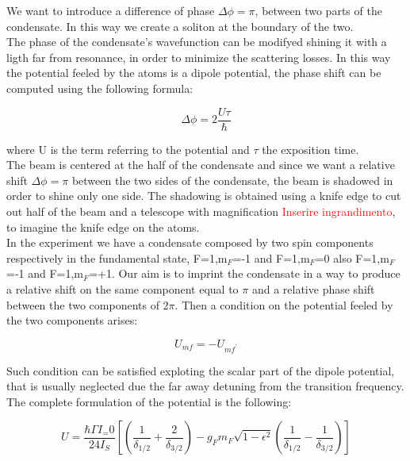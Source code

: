 \documentclass[../main.tex]{subfiles}
\begin{document}
We want to introduce a difference of phase $\Delta \phi = \pi$, between two parts of the condensate. In this way we create a soliton at the boundary of the two.\\
The phase of the condensate's wavefunction can be modifyed shining it with a ligth far from resonance, in order to minimize the scattering losses. In this way the potential feeled by the atoms is a dipole potential, the phase shift can be computed using the following formula:

\begin{equation}
\Delta \phi = 2 \frac{U \tau}{\hbar}
\end{equation}

where U is the term referring to the potential and $\tau$ the exposition time.\\
The beam is centered at the half of the condensate and since we want a relative shift $\Delta \phi = \pi$ between the two sides of the condensate, the beam is shadowed in order to shine only one side. The shadowing is obtained using a knife edge to cut out half of the beam and a telescope with magnification \textcolor{red}{Inserire ingrandimento}, to imagine the knife edge on the atoms.\\
In the experiment we have a condensate composed by two spin components respectively in the fundamental state, F=1,m$_F$=-1 and F=1,m$_F$=0 also F=1,m$_F$=-1 and F=1,m$_F$=+1. Our aim is to imprint the condensate in a way to produce a relative shift on the same component equal to $\pi$ and a relative phase shift between the two components of $2\pi$. Then a condition on the potential feeled by the two components arises:

\begin{equation}
U_{mf} = -U_{mf^\prime}
\end{equation}

Such condition can be satisfied exploting the scalar part of the dipole potential, that is usually neglected due the far away detuning from the transition frequency. The complete formulation of the potential is the following:

\begin{equation}
U = \frac{\hbar \Gamma I_=0}{24 I_S} \left[ \left( \frac{1}{\delta_{1/2}} + \frac{2}{\delta_{3/2}} \right) - g_F m_F \sqrt{1 - \epsilon^2} \left( \frac{1}{\delta_{1/2}} - \frac{1}{\delta_{3/2}} \right) \right]
\end{equation}
\end{document}
